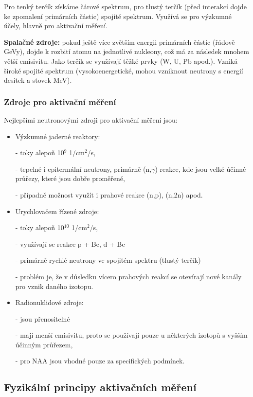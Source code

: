 Pro tenký terčík získáme čárové spektrum, pro tlustý terčík (před interakcí dojde ke zpomalení primárních částic) spojité spektrum. Využívá se pro výzkumné účely, hlavně pro aktivační měření.

\textbf{Spalačné zdroje:} pokud ještě více zvětším energii primárních částic (řádově GeVy), dojde k rozbití atomu na jednotlivé nukleony, což má za následek mnohem větší emisivitu. Jako terčík se využívají těžké prvky (W, U, Pb apod.). Vzniká široké spojité spektrum (vysokoenergetické, mohou vzniknout neutrony s energií desítek a stovek MeV).

\subsubsection{Zdroje pro aktivační měření}

Nejlepšími neutronovými zdroji pro aktivační měření jsou:

\begin{itemize}
    \item Výzkumné jaderné reaktory:
    \item[-] toky alepoň 10$^9$ 1/cm$^2$/s,
    \item[-] tepelné i epitermální neutrony, primárně (n,$\gamma$) reakce, kde jsou velké účinné průřezy, které jsou dobře proměřené,
    \item[-] případně možnost využít i prahové reakce (n,p), (n,2n) apod.
    \item Urychlovačem řízené zdroje:
    \item[-] toky alepoň 10$^10$ 1/cm$^2$/s,
    \item[-] využívají se reakce p + Be, d + Be
    \item[-] primárně rychlé neutrony ve spojitém spektru (tlustý terčík)
    \item[-] problém je, že v důsledku vícero prahových reakcí se otevírají nové kanály pro vznik daného izotopu. 
    \item Radionuklidové zdroje:
    \item[-] jsou přenositelné
    \item[-] mají menší emisivitu, proto se používají pouze u některých izotopů s vyšším účinným průřezem,
    \item[-] pro NAA jsou vhodné pouze za specifických podmínek. 
\end{itemize}

\subsection{Fyzikální principy aktivačních měření}

